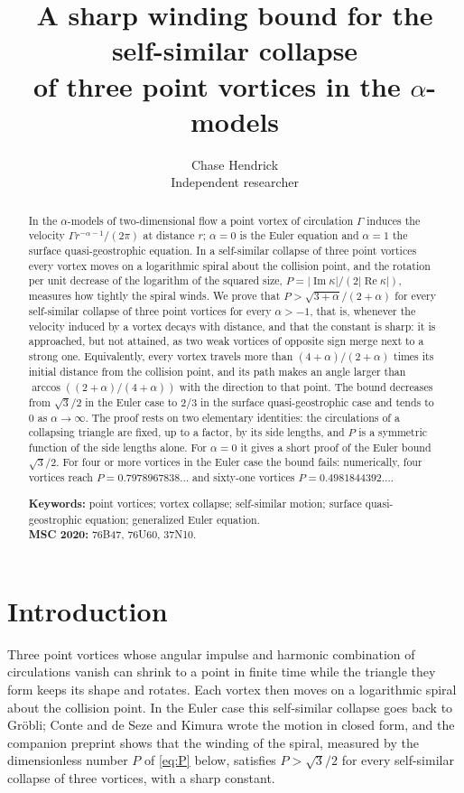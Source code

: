 \documentclass[11pt]{article}
\title{\Large\bfseries A sharp winding bound for the self-similar collapse\\
  of three point vortices in the $\alpha$-models}
\author{Chase Hendrick\\[0.2em] {\small Independent researcher}}
\date{}
\theoremstyle{definition}
\newcommand{\re}{\operatorname{Re}}
\newcommand{\im}{\operatorname{Im}}
\begin{document}
\maketitle

\begin{abstract}
In the $\alpha$-models of two-dimensional flow a point vortex of circulation $\Gamma$ induces the velocity $\Gamma r^{-\alpha-1}/(2\pi)$ at distance $r$; $\alpha = 0$ is the Euler equation and $\alpha = 1$ the surface quasi-geostrophic equation. In a self-similar collapse of three point vortices every vortex moves on a logarithmic spiral about the collision point, and the rotation per unit decrease of the logarithm of the squared size, $P = |\im\kappa|/(2|\re\kappa|)$, measures how tightly the spiral winds. We prove that $P > \sqrt{3+\alpha}/(2+\alpha)$ for every self-similar collapse of three point vortices for every $\alpha > -1$, that is, whenever the velocity induced by a vortex decays with distance, and that the constant is sharp: it is approached, but not attained, as two weak vortices of opposite sign merge next to a strong one. Equivalently, every vortex travels more than $(4+\alpha)/(2+\alpha)$ times its initial distance from the collision point, and its path makes an angle larger than $\arccos((2+\alpha)/(4+\alpha))$ with the direction to that point. The bound decreases from $\sqrt{3}/2$ in the Euler case to $2/3$ in the surface quasi-geostrophic case and tends to $0$ as $\alpha \to \infty$. The proof rests on two elementary identities: the circulations of a collapsing triangle are fixed, up to a factor, by its side lengths, and $P$ is a symmetric function of the side lengths alone. For $\alpha = 0$ it gives a short proof of the Euler bound $\sqrt{3}/2$. For four or more vortices in the Euler case the bound fails: numerically, four vortices reach $P = 0.7978967838\ldots$ and sixty-one vortices $P = 0.4981844392\ldots$.

\medskip
\noindent\textbf{Keywords:} point vortices; vortex collapse; self-similar motion; surface quasi-geostrophic equation; generalized Euler equation.\\
\textbf{MSC 2020:} 76B47, 76U60, 37N10.
\end{abstract}

\section{Introduction}

Three point vortices whose angular impulse and harmonic combination of circulations vanish can shrink to a point in finite time while the triangle they form keeps its shape and rotates. Each vortex then moves on a logarithmic spiral about the collision point. In the Euler case this self-similar collapse goes back to Gr\"obli; Conte and de Seze \cite{cds1980} and Kimura \cite{kimura1987} wrote the motion in closed form, and the companion preprint \cite{hendrick2026} shows that the winding of the spiral, measured by the dimensionless number $P$ of \eqref{eq:P} below, satisfies $P > \sqrt{3}/2$ for every self-similar collapse of three vortices, with a sharp constant.
\end{document}

